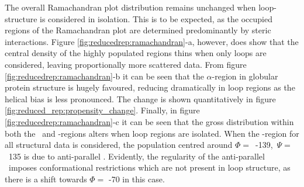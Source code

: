 The overall Ramachandran plot distribution remains unchanged when loop-structure is considered in isolation. This is to be expected, as the occupied regions of the Ramachandran plot are determined predominantly by steric interactions. Figure \ref{fig:reducedrep:ramachandran}-a, however, does show that the central density of the highly populated regions thins when only loops are considered, leaving proportionally more scattered data. From figure \ref{fig:reducedrep:ramachandran}-b it can be seen that the $\alpha$-region in globular protein structure is hugely favoured, reducing dramatically in loop regions as the helical bias is less pronounced. The change is shown quantitatively in figure \ref{fig:reduced_rep:propensity_change}.
Finally, in figure \ref{fig:reducedrep:ramachandran}-c it can be seen that the gross distribution within both the \al\ and \be-regions alters when loop regions are isolated.
When the \be-region for all structural data is considered, the population centred around  \mbox{$\Phi=$ -139, $\Psi=$ 135} is due to anti-parallel \bsheet. Evidently, the regularity of the anti-parallel \bsheet\ imposes conformational restrictions which are not present in loop structure, as there is a shift towards $\Phi=$ -70 in this case.


